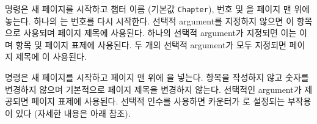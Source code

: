\cmd{\chapter}  명령은 새 페이지를 시작하고 챕터 이름 (기본값 \texttt{Chapter}), 번호 및 을 페이지 맨 위에 놓는다.
하나의 \cmd{\section}는 번호를 다시 시작한다.
선택적 argument를 지정하지 않으면  이 \toc{}항목으로 사용되며 페이지 제목에 사용된다.
하나의 선택적 argument가 지정되면 이는  이며 \toc{}항목 및 페이지 표제에 사용된다.
두 개의 선택적 argument가 모두 지정되면 페이지 제목에 이 사용된다.

\cmd{\chapter*}명령은 새 페이지를 시작하고 페이지 맨 위에 을 넣는다. \toc{}항목을 작성하지 않고 숫자를 변경하지 않으며 기본적으로 페이지 제목을 변경하지 않는다.
선택적인   argument가 제공되면 페이지 표제에 사용된다. 선택적 인수를 사용하면  카운터가  로 설정되는 부작용이 있다 (자세한 내용은 아래 참조).

